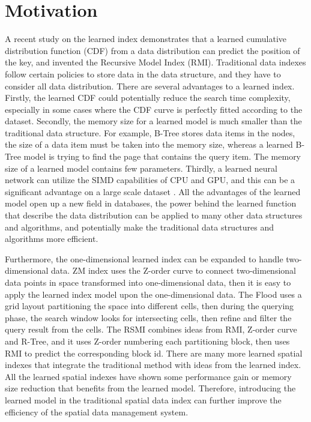 \section{Motivation}
A recent study on the learned index \cite{Kraska:2017vh} demonstrates that a learned cumulative distribution function (CDF) from a data distribution can predict the position of the key, and invented the Recursive Model Index (RMI). Traditional data indexes follow certain policies to store data in the data structure, and they have to consider all data distribution. There are several advantages to a learned index. Firstly, the learned CDF could potentially reduce the search time complexity, especially in some cases where the CDF curve is perfectly fitted according to the dataset. Secondly, the memory size for a learned model is much smaller than the traditional data structure. For example, B-Tree stores data items in the nodes, the size of a data item must be taken into the memory size, whereas a learned B-Tree model is trying to find the page that contains the query item. The memory size of a learned model contains few parameters. Thirdly, a learned neural network can utilize the SIMD capabilities of CPU and GPU, and this can be a significant advantage on a large scale dataset \cite{patterson2016computer}. All the advantages of the learned model open up a new field in databases, the power behind the learned function that describe the data distribution can be applied to many other data structures and algorithms, and potentially make the traditional data structures and algorithms more efficient. 

Furthermore, the one-dimensional learned index can be expanded to handle two-dimensional data. ZM index \cite{Wang:2019ks} uses the Z-order curve to connect two-dimensional data points in space transformed into one-dimensional data, then it is easy to apply the learned index model upon the one-dimensional data. The Flood \cite{Nathan:2019wc} uses a grid layout partitioning the space into different cells, then during the querying phase, the search window looks for intersecting cells, then refine and filter the query result from the cells. The RSMI \cite{Qi:2020uz} combines ideas from RMI, Z-order curve and R-Tree, and it uses Z-order numbering each partitioning block, then uses RMI to predict the corresponding block id. There are many more learned spatial indexes that integrate the traditional method with ideas from the learned index. All the learned spatial indexes have shown some performance gain or memory size reduction that benefits from the learned model. Therefore, introducing the learned model in the traditional spatial data index can further improve the efficiency of the spatial data management system. 



